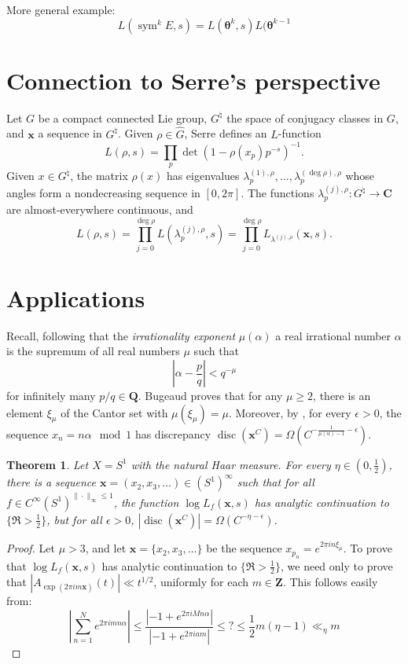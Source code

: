 \documentclass{article}
\DeclareMathOperator{\disc}{disc}
\DeclareMathOperator{\sym}{sym}
\newcommand{\bC}{\mathbf{C}}
\newcommand{\bQ}{\mathbf{Q}}
\newcommand{\btheta}{{\boldsymbol{\theta}}}
\newcommand{\bx}{{\boldsymbol x}}
\newcommand{\bZ}{\mathbf{Z}}
\newtheorem{theorem}[subsection]{Theorem}
\theoremstyle{definition}
\begin{document}
More general example:
\[
	L(\sym^k E,s) = L(\btheta^k, s) L(\btheta^{k-1}
\]





\section{Connection to Serre's perspective}

Let $G$ be a compact connected Lie group, $G^\natural$ the space of conjugacy 
classes in $G$, and $\bx$ a sequence in $G^\natural$. Given 
$\rho\in \widehat G$, Serre defines an $L$-function 
\[
	L(\rho,s) =\prod_p \det(1-\rho(x_p)p^{-s})^{-1} .
\]
Given $x\in G^\natural$, the matrix $\rho(x)$ has eigenvalues 
$\lambda_p^{(1),\rho},\dots,\lambda_p^{(\deg\rho),\rho}$ whose angles form a 
nondecreasing sequence in $[0,2\pi]$. The functions 
$\lambda_p^{(j),\rho}\colon G^\natural\to \bC$ are almost-everywhere 
continuous, and 
\[
	L(\rho,s) = \prod_{j=0}^{\deg\rho} L(\lambda_p^{(j),\rho},s) = \prod_{j=0}^{\deg\rho} L_{\lambda^{(j),\rho}}(\bx,s).
\]





\section{Applications}\label{sec:application}

Recall, following \cite{bugeaud-2008} that the \emph{irrationality exponent} 
$\mu(\alpha)$ a real irrational number $\alpha$ is the supremum of all real 
numbers $\mu$ such that 
\[
	\left|\alpha-\frac{p}{q}\right| < q^{-\mu}
\]
for infinitely many $p/q\in \bQ$. Bugeaud proves that for any 
$\mu\geqslant 2$, there is an element $\xi_\mu$ of the Cantor set with 
$\mu(\xi_\mu)=\mu$. Moreover, by \cite[?]{kuipers-niederreiter-1974}, for 
every $\epsilon>0$, the sequence $x_n=n\alpha\mod 1$ has discrepancy 
$\disc(\bx^C)=\Omega(C^{-\frac{1}{\mu(\alpha)-1}-\epsilon})$. 

\begin{theorem}
Let $X=S^1$ with the natural Haar measure. For every $\eta\in (0,\frac 1 2)$, 
there is a sequence $\bx=(x_2,x_3,\dots)\in (S^1)^\infty$ such that for all 
$f\in C^\infty(S^1)^{\|\cdot\|_\infty\leqslant 1}$, the function 
$\log L_f(\bx,s)$ has analytic continuation to $\{\Re>\frac 1 2\}$, but for 
all $\epsilon>0$, $|\disc(\bx^C)|=\Omega(C^{-\eta-\epsilon})$. 
\end{theorem}
\begin{proof}
Let $\mu>3$, and let 
$\bx=\{x_2,x_3,\dots\}$ be the sequence $x_{p_n}=e^{2\pi i n \xi_\mu}$. To 
prove that $\log L_f(\bx,s)$ has analytic continuation to $\{\Re >\frac 1 2\}$, 
we need only to prove that $|A_{\exp(2\pi i m \bx)}(t)| \ll t^{1/2}$, uniformly 
for each $m\in \bZ$. This follows easily from:
\[
	\left| \sum_{n=1}^N e^{2\pi i m n \alpha}\right| \leqslant \frac{|-1+e^{2\pi i M n \alpha}|}{|-1+e^{2\pi i a m}|} \leqslant ? \leqslant \frac 1 2 m (\eta-1) \ll_\eta m
\]
\end{proof}





\printbibliography
\end{document}
